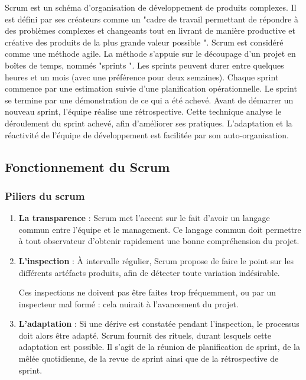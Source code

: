 Scrum est un schéma d’organisation de développement de produits complexes. Il est défini par ses créateurs comme un "cadre de travail permettant de répondre à des problèmes complexes et changeants tout en livrant de manière productive et créative des produits de la plus grande valeur possible ". Scrum est considéré comme une méthode agile.
\jumpOne
La méthode s'appuie sur le découpage d'un projet en boîtes de temps, nommés "sprints ". Les sprints peuvent durer entre quelques heures et un mois (avec une préférence pour deux semaines). Chaque sprint commence par une estimation suivie d'une planification opérationnelle. Le sprint se termine par une démonstration de ce qui a été achevé. Avant de démarrer un nouveau sprint, l'équipe réalise une rétrospective. Cette technique analyse le déroulement du sprint achevé, afin d'améliorer ses pratiques. L'adaptation et la réactivité de l'équipe de développement est facilitée par son auto-organisation.


\subsection{Fonctionnement du Scrum}

\subsubsection{Piliers du scrum}

\begin{enumerate}
\item \textbf{La transparence} : Scrum met l'accent sur le fait d'avoir un langage commun entre l'équipe et le management. Ce langage commun doit permettre à tout observateur d'obtenir rapidement une bonne compréhension du projet.
\item \textbf{L'inspection }: À intervalle régulier, Scrum propose de faire le point sur les différents artéfacts produits, afin de détecter toute variation indésirable.

Ces inspections ne doivent pas être faites trop fréquemment, ou par un inspecteur mal formé : cela nuirait à l'avancement du projet.
\item \textbf{L'adaptation} : Si une dérive est constatée pendant l'inspection, le processus doit alors être adapté. Scrum fournit des rituels, durant lesquels cette adaptation est possible. Il s'agit de la réunion de planification de sprint, de la mêlée quotidienne, de la revue de sprint ainsi que de la rétrospective de sprint.
\end{enumerate}

